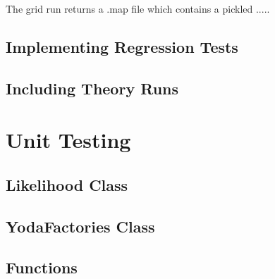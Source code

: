 The grid run returns a .map file which contains a pickled  .....




\subsection{Implementing Regression Tests}


\subsection{Including Theory Runs}

\section{Unit Testing}
\subsection{Likelihood Class}
\subsection{YodaFactories Class}
\subsection{Functions}


